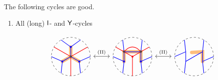 \begin{example}
The following cycles are good.
\begin{enumerate}
\item All (long) $\mathsf{I}$- and $\mathsf{Y}$-cycles

\[
\begin{tikzcd}[row sep=0pc]
\begin{tikzpicture}[baseline=-.5ex,scale=0.5]
\draw [dashed] (0,0) circle [radius=2];


\draw [color=cyclecolor1, line cap=round, line width=5, opacity=0.5] (90:1) to (0,0) (-30:1) to (0,0) (-150:1) to (0,0);

\draw [blue, thick] 
(0,0) -- (90:1) -- (60:2) (90:1)-- (120:2)
(0,0) -- (-30:1) -- (0:2) (-30:1)-- (-60:2)
(0,0) -- (-150:1) -- (-120:2) (-150:1)-- (180:2);

\draw [red, thick] (0,0)--(30:2) (0,0)--(150:2) (0,0)--(-90:2);

\draw[thick,blue,fill=blue] (90:1) circle (2pt) 
(-30:1) circle (2pt)
(-150:1) circle (2pt);
\draw[thick,black,fill=white] (0,0) circle (2pt);
\end{tikzpicture}
\arrow[leftrightarrow,r,"\Move{II}"]&
\begin{tikzpicture}[baseline=-.5ex,scale=0.5]
\draw [dashed] (0,0) circle [radius=2];

\draw [color=cyclecolor1, line cap=round, line width=5, opacity=0.5] (-150:1) -- (150:1) -- (30:1) -- (-30:1);

\draw [blue, thick] 
(-150:1) -- (150:1) -- (120:2)
(-30:1) -- (30:1) -- (60:2)
(150:1) -- (30:1)
(-30:1) -- (0:2) (-30:1)-- (-60:2)
(-150:1) -- (-120:2) (-150:1)-- (180:2);

\draw [red, thick] 
(150:1) to[out=45,in=180] (90:1) to[out=0,in=135] (30:1)
(0,0)--(30:2) (0,0)--(150:2) (0,0)--(-90:2);

\draw[thick,blue,fill=blue] 
(-30:1) circle (2pt)
(-150:1) circle (2pt);
\draw[thick,red,fill=red] 
(0,0) circle (2pt);
\draw[thick,black,fill=white] 
(30:1) circle (2pt)
(150:1) circle (2pt);
\end{tikzpicture}
\arrow[leftrightarrow,r,"\Move{II}"]&
\begin{tikzpicture}[baseline=-.5ex,scale=0.5]
\draw [dashed] (0,0) circle [radius=2];


\draw [color=cyclecolor1, line cap=round, line width=5, opacity=0.5] (120:0.5) -- (30:1) --(-30:1) ;

\draw [blue, thick] 
(60:2) -- (30:1) -- (-30:1) -- (0:2)
(-30:1) -- (-60:2)
(30:1) -- (-150:1) -- (-120:2)
(-150:1) -- (150:1)-- (180:2)
(150:1) -- (120:2);


\end{tikzpicture}
\end{tikzcd}\]
\end{enumerate}
\end{example}
